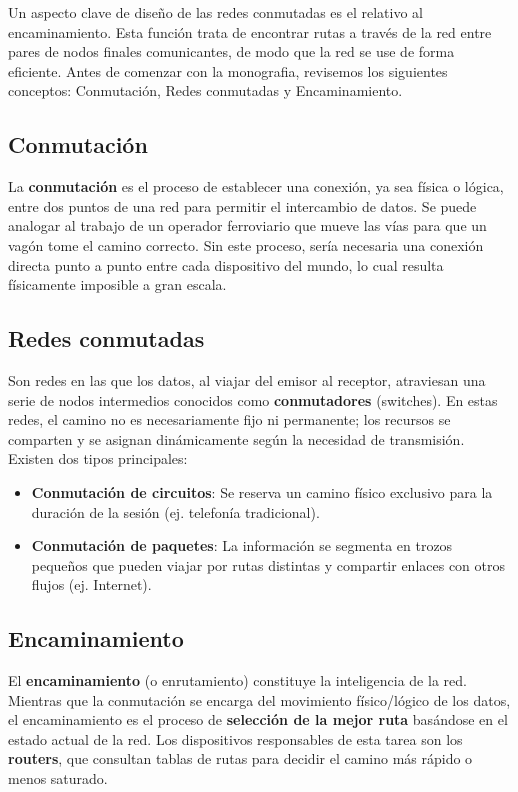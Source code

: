 Un aspecto clave de diseño de las redes conmutadas es el relativo al encaminamiento. Esta función trata de encontrar rutas a través de la red entre pares de nodos finales comunicantes, de modo que la red se use de forma eficiente. Antes de comenzar con la monografia, revisemos los siguientes conceptos: Conmutación, Redes conmutadas y Encaminamiento.

\subsection{Conmutación}

La \textbf{conmutación} es el proceso de establecer una conexión, ya sea física o lógica, entre dos puntos de una red para permitir el intercambio de datos. Se puede analogar al trabajo de un operador ferroviario que mueve las vías para que un vagón tome el camino correcto. Sin este proceso, sería necesaria una conexión directa punto a punto entre cada dispositivo del mundo, lo cual resulta físicamente imposible a gran escala.

\subsection{Redes conmutadas}

Son redes en las que los datos, al viajar del emisor al receptor, atraviesan una serie de nodos intermedios conocidos como \textbf{conmutadores} (switches). En estas redes, el camino no es necesariamente fijo ni permanente; los recursos se comparten y se asignan dinámicamente según la necesidad de transmisión. Existen dos tipos principales:

\begin{itemize}
	\item \textbf{Conmutación de circuitos}: Se reserva un camino físico exclusivo para la duración de la sesión (ej. telefonía tradicional).
	\item \textbf{Conmutación de paquetes}: La información se segmenta en trozos pequeños que pueden viajar por rutas distintas y compartir enlaces con otros flujos (ej. Internet).
\end{itemize}

\subsection{Encaminamiento}

El \textbf{encaminamiento} (o enrutamiento) constituye la inteligencia de la red. Mientras que la conmutación se encarga del movimiento físico/lógico de los datos, el encaminamiento es el proceso de \textbf{selección de la mejor ruta} basándose en el estado actual de la red. Los dispositivos responsables de esta tarea son los \textbf{routers}, que consultan tablas de rutas para decidir el camino más rápido o menos saturado.

